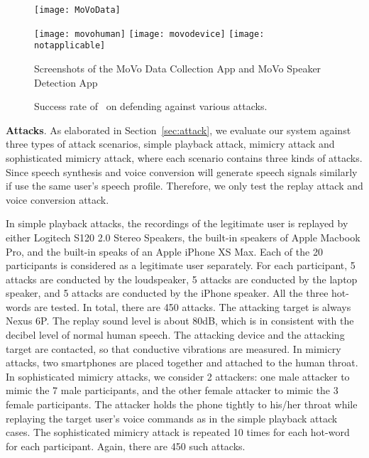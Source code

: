 \begin{figure}[h]
		\centering
		\begin{minipage}{.3\linewidth}
			\texttt{[image: MoVoData]}
		\end{minipage}
	\hfill
	\begin{minipage}{.6\linewidth}
		\texttt{[image: movohuman]}
		\vspace{.1in}
		\texttt{[image: movodevice]}
		\vspace{.1in}
		\texttt{[image: notapplicable]}
	\end{minipage}
	\caption{Screenshots of the MoVo Data Collection App and MoVo Speaker Detection App}	
	\label{fig:defendapp}
\end{figure}

\begin{figure}[h]
	\centering
	\caption{Success rate of \shortname~on defending against various attacks. }
	\label{fig:defend}
\end{figure}

\textbf{Attacks}. As elaborated in Section~\ref{sec:attack}, we evaluate our system against three types of attack scenarios, simple playback attack, mimicry attack and sophisticated mimicry attack, where each scenario contains three kinds of attacks.  Since speech synthesis and voice conversion will generate speech signals similarly if use the same user's speech profile. Therefore, we only test the replay attack and voice conversion attack.

In simple playback attacks, the recordings of the legitimate user is replayed by either Logitech S120 2.0 Stereo Speakers, the built-in speakers of Apple Macbook Pro, and the built-in speaks of an Apple iPhone XS Max. Each of the 20 participants is considered as a legitimate user separately. For each participant, 5 attacks are conducted by the loudspeaker, 5 attacks are conducted by the laptop speaker, and 5 attacks are conducted by the iPhone speaker. All the three hot-words are tested. In total, there are 450 attacks. The attacking target is always Nexus 6P. The replay sound level is about 80dB, which is in consistent with the decibel level of normal human speech. 
The attacking device and the attacking target  are contacted, so that conductive vibrations are measured. In mimicry attacks, two smartphones are placed together and attached to the human throat. In sophisticated mimicry attacks, we consider 2 attackers: one male attacker to mimic the 7 male participants, and the other female attacker to mimic the 3 female participants. The attacker holds the phone tightly to his/her throat while replaying the target user's voice commands as in the simple playback attack cases. The sophisticated mimicry attack is repeated 10 times for each hot-word for each participant. Again, there are 450 such attacks.

